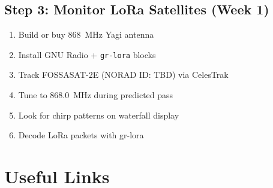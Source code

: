 \documentclass[12pt,a4paper]{article}
\begin{document}
\subsection{Step 3: Monitor LoRa Satellites (Week 1)}
\begin{enumerate}
    \item Build or buy 868~MHz Yagi antenna
    \item Install GNU Radio + \texttt{gr-lora} blocks
    \item Track FOSSASAT-2E (NORAD ID: TBD) via CelesTrak
    \item Tune to 868.0~MHz during predicted pass
    \item Look for chirp patterns on waterfall display
    \item Decode LoRa packets with gr-lora
\end{enumerate}

\section{Useful Links}
\end{document}
